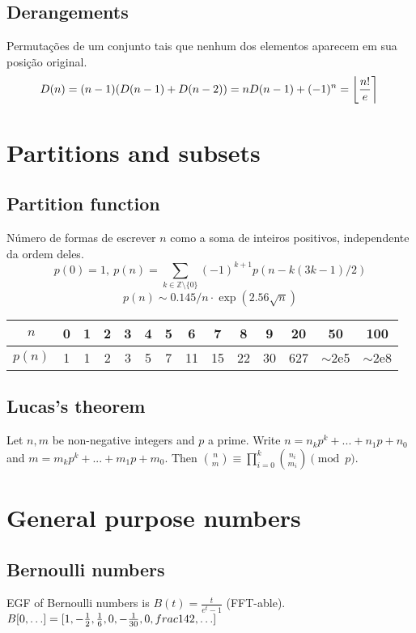 \subsection{Derangements}
		Permutações de um conjunto tais que nenhum dos elementos aparecem em sua posição original.
		\small
		\[ \mkern-2mu D(n) = (n-1)(D(n-1)+D(n-2)) = n D(n-1)+(-1)^n = \left\lfloor\frac{n!}{e}\right\rceil \]
		\normalsize

\section{Partitions and subsets}
	\subsection{Partition function}
		Número de formas de escrever $n$ como a soma de inteiros positivos, independente da ordem deles.
		\small
		\[ p(0) = 1,\ p(n) = \sum_{k \in \mathbb Z \setminus \{0\}}{(-1)^{k+1} p(n - k(3k-1) / 2)} \]
		\[ p(n) \sim 0.145 / n \cdot \exp(2.56 \sqrt{n}) \]

		\begin{center}
		\begin{tabular}{c|c@{\ }c@{\ }c@{\ }c@{\ }c@{\ }c@{\ }c@{\ }c@{\ }c@{\ }c@{\ }c@{\ }c@{\ }c}
			$n$    & 0 & 1 & 2 & 3 & 4 & 5 & 6  & 7  & 8  & 9  & 20  & 50  & 100 \\ \hline
			$p(n)$ & 1 & 1 & 2 & 3 & 5 & 7 & 11 & 15 & 22 & 30 & 627 & $\mathtt{\sim}$2e5 & $\mathtt{\sim}$2e8 \\
		\end{tabular}
		\end{center}
		\normalsize
    
    \subsection{Lucas's theorem}
		Let $n,m$ be non-negative integers and $p$ a prime. Write $n=n_k p^k+...+n_1 p+n_0$ and $m=m_k p^k+...+m_1 p + m_0$. Then $\binom{n}{m} \equiv \prod_{i = 0}^k\binom{n_i}{m_i} \pmod{p}$.


\section{General purpose numbers}
	\subsection{Bernoulli numbers}
		EGF of Bernoulli numbers is $B(t)=\frac{t}{e^t-1}$ (FFT-able).
		$B[0,\ldots] = [1, -\frac{1}{2}, \frac{1}{6}, 0, -\frac{1}{30}, 0, \\frac{1}{42}, \ldots]$

